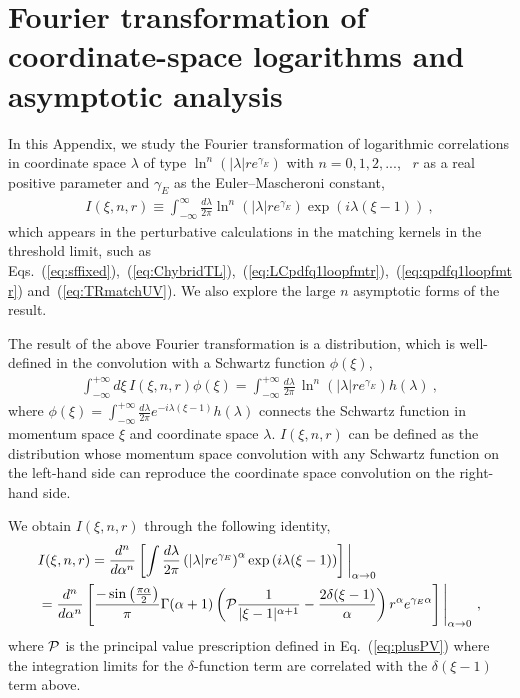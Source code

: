 \documentclass[a4paper,11pt]{article}
\begin{document}
\fi


\section{Fourier transformation of coordinate-space logarithms and asymptotic analysis}\label{sec:FTofLogsasymp}

In this Appendix, we study the Fourier transformation of 
logarithmic correlations in coordinate space $\lambda$ of type $\ln^{n}\left(|\lambda|r e^{\gamma_E} \right)$ with $n=0,1,2,...$, \, $r$ as
a real positive parameter and $\gamma_E$ as the Euler–Mascheroni constant,
\begin{align}\label{eq:FTevenlog}
I(\xi, n,r) \equiv \int_{-\infty}^{\infty} \frac{d \lambda}{2 \pi} \ln^{n}\left(|\lambda| r e^{\gamma_E} \right) \exp \left(i \lambda (\xi-1)\right) \ ,
\end{align}
which appears in the perturbative calculations in the matching kernels in the threshold limit, such as Eqs.~(\ref{eq:sffixed}),~(\ref{eq:ChybridTL}),~(\ref{eq:LCpdfq1loopfmtr}),~(\ref{eq:qpdfq1loopfmtr}) and~(\ref{eq:TRmatchUV}). We also explore the large $n$ asymptotic forms of the result.

The result of the above Fourier transformation is a distribution, which is well-defined in the convolution with a Schwartz function $\phi(\xi)$, 
\begin{align}\label{eq:condist}
    \int_{-\infty}^{+\infty} d\xi \, I(\xi, n,r) \phi(\xi) 
    = \int_{-\infty}^{+\infty} \frac{d\lambda}{2\pi} \, \ln^{n}\left(|\lambda| r e^{\gamma_E} \right) h(\lambda) \ ,
\end{align}
where $\phi(\xi) = \int_{-\infty}^{+\infty} \frac{d \lambda}{2\pi} e^{-i \lambda (\xi-1)} h(\lambda)$ connects the Schwartz function in momentum space $\xi$ and coordinate space $\lambda$. $I(\xi, n,r)$ can be defined as the distribution whose momentum space convolution with any Schwartz function on the left-hand side can reproduce the coordinate space convolution on the right-hand side.

We obtain $I(\xi,n,r)$ through the following identity,
\begin{align}\label{eq:FTforalpha}
&I(\xi, n,r) = \frac{d^n}{d\alpha^n}\left[ \int \frac{d \lambda}{2 \pi} \left(|\lambda| r e^{\gamma_E} \right)^{\alpha} \exp \left(i \lambda (\xi-1)\right) \right] \bigg|_{\alpha \rightarrow 0} \nonumber\\
&= \frac{d^n}{d\alpha^n}\left[ \frac{-\sin\left(\frac{\pi \alpha}{2}\right)}{\pi} \Gamma (\alpha +1) \left({\cal P} \frac{1}{|\xi-1|^{\alpha+1}}-\frac{2 \delta (\xi -1)}{\alpha }\right) r^{\alpha } e^{\gamma_E  \alpha } \right] \Bigg|_{\alpha \rightarrow 0} \ , 
\end{align}
where ${\cal P}$ is the principal value prescription defined in Eq.~(\ref{eq:plusPV}) where the integration limits for the $\delta$-function term are correlated with 
the $\delta(\xi-1)$ term above. 
\end{document}
